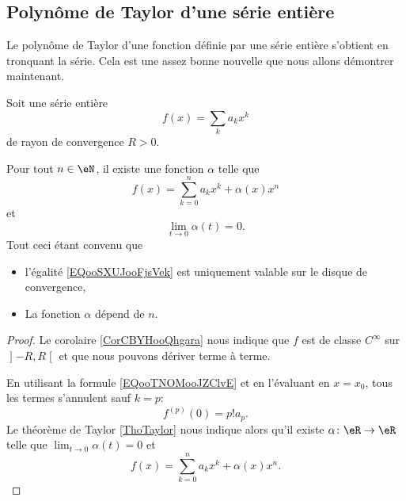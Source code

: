 \subsection{Polynôme de Taylor d'une série entière}

Le polynôme de Taylor d'une fonction définie par une série entière s'obtient en tronquant la série. Cela est une assez bonne nouvelle que nous allons démontrer maintenant.

\begin{proposition}      \label{PROPooQLHNooRsBYbe}
    Soit une série entière
    \begin{equation}
        f(x)=\sum_ka_kx^k
    \end{equation}
    de rayon de convergence \( R>0\).

    Pour tout \( n\in \eN\), il existe une fonction \( \alpha\) telle que
    \begin{equation}    \label{EQooSXUJooFjsVek}
        f(x)=\sum_{k=0}^na_kx^k+\alpha(x)x^n
    \end{equation}
    et 
    \begin{equation}
        \lim_{t\to 0} \alpha(t)=0.
    \end{equation}
    Tout ceci étant convenu que
    \begin{itemize}
        \item 
            l'égalité \eqref{EQooSXUJooFjsVek} est uniquement valable sur le disque de convergence,
        \item La fonction \( \alpha\) dépend de \( n\).
    \end{itemize}
\end{proposition}

\begin{proof}
    Le corolaire \ref{CorCBYHooQhgara} nous indique que \( f\) est de classe \(  C^{\infty}\) sur \( \mathopen] -R , R \mathclose[\) et que nous pouvons dériver terme à terme.

        En utilisant la formule \eqref{EQooTNOMooJZClvE} et en l'évaluant en \( x=x_0\), tous les termes s'annulent sauf \( k=p\):
        \begin{equation}
            f^{(p)}(0)=p!a_p.
        \end{equation}
        Le théorème de Taylor \ref{ThoTaylor} nous indique alors qu'il existe \( \alpha\colon \eR\to \eR\) telle que \( \lim_{t\to 0} \alpha(t)=0\) et
        \begin{equation}
            f(x)=\sum_{k=0}^{n}a_kx^k+\alpha(x)x^n.
        \end{equation}
\end{proof}

